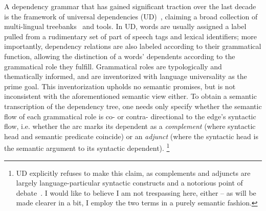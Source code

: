 A dependency grammar that has gained significant traction over the last decade is the framework of universal dependencies (UD)~\cite{10.1162/coli_a_00402}, claiming a broad collection of multi-lingual treebanks~\cite{nivre2020universal} and tools.
In UD, words are usually assigned a label pulled from a rudimentary set of part of speech tags and lexical identifiers; more importantly, dependency relations are also labeled according to their grammatical function, allowing the distinction of a words' dependents according to the grammatical role they fulfill.
Grammatical roles are typologically and thematically informed, and are inventorized with language universality as the prime goal.
This inventorization upholds no semantic promises, but is not inconsistent with the aforementioned semantic view either.
To obtain a semantic transcription of the dependency tree, one needs only specify whether the semantic flow of each grammatical role is co- or contra- directional to the edge's syntactic flow, i.e. whether the arc marks its dependent as a \textit{complement} (where syntactic head and semantic predicate coincide) or an \textit{adjunct} (where the syntactic head is the semantic argument to its syntactic dependent).%
	\footnote{UD explicitly refuses to make this claim, as complements and adjuncts are largely language-particular syntactic constructs and a notorious point of debate~\cite{haspelmath2014arguments}.
	I would like to believe I am not trespassing here, either -- as will be made clearer in a bit, I employ the two terms in a purely semantic fashion.}

